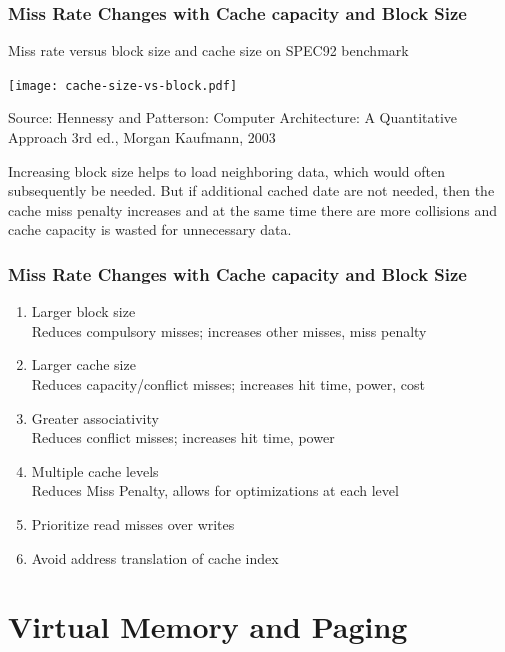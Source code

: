 \documentclass{beamer}
\begin{document}
\begin{frame}
\frametitle{Miss Rate Changes with Cache capacity and Block Size}

Miss rate versus block size and cache size on SPEC92 benchmark

\vskip 2mm

{
\centering

\texttt{[image: cache-size-vs-block.pdf]}

}

\vskip 2mm

{\tiny Source: Hennessy and Patterson: Computer Architecture: A Quantitative Approach 3rd ed., Morgan Kaufmann, 2003}

Increasing block size helps to load neighboring data, which would often subsequently be needed.
But if additional cached date are not needed, then the cache miss penalty increases and at the same time there are more collisions and cache capacity is wasted for unnecessary data.

\end{frame}


\begin{frame}
\frametitle{Miss Rate Changes with Cache capacity and Block Size}

\begin{enumerate}
\item Larger block size \\ Reduces compulsory misses; increases other misses, miss penalty
\item Larger cache size \\ Reduces capacity/conflict misses; increases hit time, power, cost
\item Greater associativity \\ Reduces conflict misses; increases hit time, power
\item Multiple cache levels \\ Reduces Miss Penalty, allows for optimizations at each level
\item Prioritize read misses over writes
\item Avoid address translation of cache index
\end{enumerate}

\end{frame}


\section{Virtual Memory and Paging}
\end{document}

